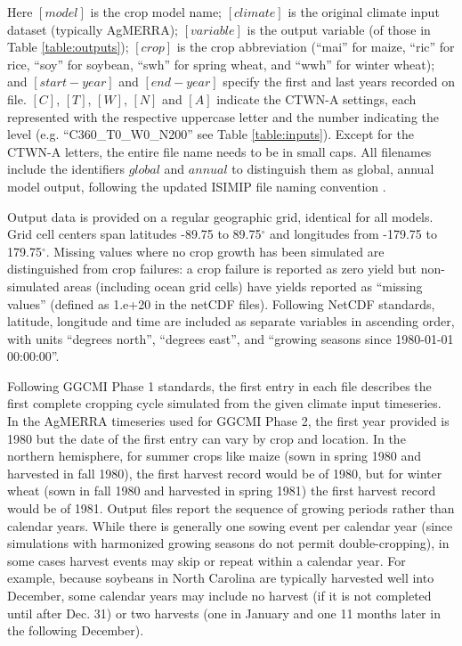 \documentclass[gmd, manuscript]{copernicus} %
\begin{document}

\noindent Here $[model]$ is the crop model name; $[climate]$ is the original climate input dataset (typically AgMERRA); $[variable]$ is the output variable (of those in Table \ref{table:outputs}); $[crop]$ is the crop abbreviation (``mai'' for maize, ``ric'' for rice, ``soy'' for soybean, ``swh'' for spring wheat, and ``wwh'' for winter wheat); and $[start-year]$ and $[end-year]$ specify the first and last years recorded on file.
$[C]$, $[T]$, $[W]$, $[N]$ and $[A]$ indicate the CTWN-A settings, each represented with the respective uppercase letter and the number indicating the level (e.g. ``C360\_T0\_W0\_N200'' see Table \ref{table:inputs}). 
Except for the CTWN-A letters, the entire file name needs to be in small caps. 
All filenames include the identifiers $global$ and $annual$ to distinguish them as global, annual model output, following the updated ISIMIP file naming convention \citep{frieler2017assessing}.

Output data is provided on a regular geographic grid, identical for all models. 
Grid cell centers span latitudes -89.75 to 89.75$^{\circ}$ and longitudes from -179.75 to 179.75$^{\circ}$. 
Missing values where no crop growth has been simulated are distinguished from crop failures: a crop failure is reported as zero yield but non-simulated areas (including ocean grid cells) have yields reported as ``missing values'' (defined as 1.e+20 in the netCDF files). 
Following NetCDF standards, latitude, longitude and time are included as separate variables in ascending order, with
units ``degrees north'', ``degrees east'', and ``growing seasons since 1980-01-01 00:00:00''. 

Following GGCMI Phase 1 standards, the first entry in each file describes the first complete cropping cycle simulated from the given climate input timeseries. 
In the AgMERRA timeseries used for GGCMI Phase 2, the first year provided is 1980 but the date of the first entry can vary by crop and location. 
In the northern hemisphere, for summer crops like maize (sown in spring 1980 and harvested in fall 1980), the first harvest record would be of 1980, but for winter wheat (sown in fall 1980 and harvested in spring 1981) the first harvest record would be of 1981. Output files report the sequence of growing periods rather than calendar years. 
While there is generally one sowing event per calendar year (since simulations with harmonized growing seasons do not permit double-cropping), in some cases harvest events may skip or repeat within a calendar year.
For example, because soybeans in North Carolina are typically harvested well into December, some calendar years may include no harvest (if it is not completed until after Dec. 31) or two harvests (one in January and one 11 months later in the following December). 
\end{document}
